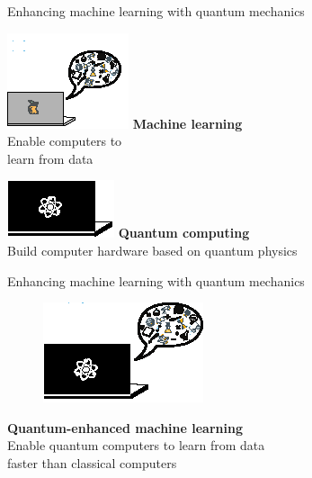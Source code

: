 \documentclass[10pt]{beamer}
\begin{document}
{
\begin{frame}[fragile]{Enhancing machine learning with quantum mechanics}

\begin{minipage}[c]{0.59\textwidth}
\includegraphics[scale=3.5]{Vectors/laptop_ml.eps}
\newline
\textbf{Machine learning}\\
Enable computers to\\
learn from data
\end{minipage}%
\begin{minipage}[c]{0.39\textwidth}
\vspace{2.8cm}
\centering
\hspace{-1cm}\includegraphics[scale=2.2]{Vectors/laptop_q.eps}
\flushleft
\textbf{Quantum computing}\\
Build computer hardware based on quantum physics
\end{minipage}

\end{frame}
}

{
\begin{frame}[fragile]{Enhancing machine learning with quantum mechanics}

\begin{figure}
\centering
\hspace{2cm}
\includegraphics[scale=3]{Vectors/laptop_qml.eps}
\end{figure}
\centering
\textbf{Quantum-enhanced machine learning}\\
Enable quantum computers to learn from data\\
faster than classical computers

\end{frame}
}
\end{document}
